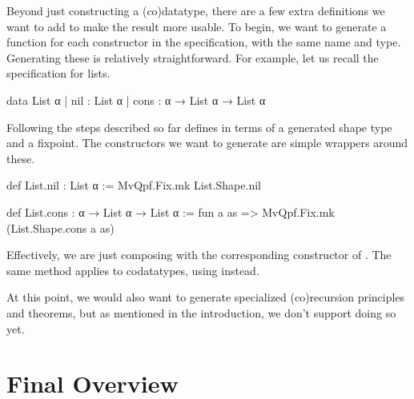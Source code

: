 Beyond just constructing a (co)datatype, there are a few extra definitions we want to add to make the result more usable. To begin, we want to generate a function for each constructor 
in the specification, with the same name and type. Generating these is relatively straightforward.
For example, let us recall the specification for lists.
\begin{leancode}
  data List α
    | nil  : List α 
    | cons : α → List α → List α
\end{leancode}
Following the steps described so far defines  in terms of a generated shape type 
and a fixpoint. The constructors we want to generate are simple wrappers around these.
\begin{leancode}
  def List.nil : List α 
    := MvQpf.Fix.mk List.Shape.nil

  def List.cons : α → List α → List α 
    := fun a as => MvQpf.Fix.mk (List.Shape.cons a as)
\end{leancode}
Effectively, we are just composing  with the corresponding constructor of .
The same method applies to codatatypes, using  instead.

At this point, we would also want to generate specialized (co)recursion principles and 
theorems, but as mentioned in the introduction, we don't support doing so yet.


\section{Final Overview}%
\label{sec:procedure:overview}

